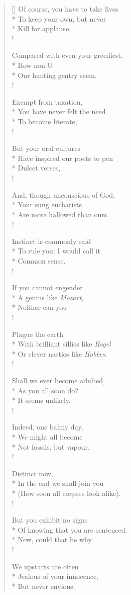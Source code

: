 \documentclass[MAIN]{subfiles}
\begin{document}
\begin{verse}[\versewidth]
Of course, you have to take lives\\*
To keep your own, but never\\*
Kill for applause.\\!

Compared with even your greediest,\\*
How non-U\\*
Our hunting gentry seem.\\!

Exempt from taxation,\\*
You have never felt the need\\*
To become literate,\\!

But your oral cultures\\*
Have inspired our poets to pen\\*
Dulcet verses,\\!

And, though unconscious of God,\\*
Your sung eucharists\\*
Are more hallowed than ours.\\!

Instinct is commonly said\\*
To rule you: I would call it\\*
Common sense.\\!

If you cannot engender\\*
A genius like \emph{Mozart},\\*
Neither can you\\!

Plague the earth\\*
With brilliant sillies like \emph{Hegel}\\*
Or clever nasties like \emph{Hobbes}.\\!

Shall we ever become adulted,\\*
As you all soon do?\\*
It seems unlikely.\\!

Indeed, one balmy day,\\*
We might all become\\*
Not fossils, but vapour.\\!

Distinct now,\\*
In the end we shall join you\\*
(How soon all corpses look alike),\\!

But you exhibit no signs\\*
Of knowing that you are sentenced.\\*
Now, could that be why\\!

We upstarts are often\\*
Jealous of your innocence,\\*
But never envious.
\end{verse}
\end{document}
